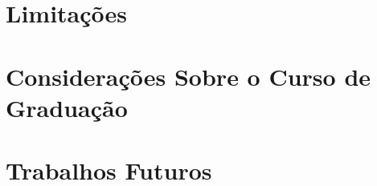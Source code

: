 %
%
%

\section{Limitações}
\label{sec:conc_limitacoes}


\section{Considerações Sobre o Curso de Graduação}
\label{sec:conc_graduacao}


\section{Trabalhos Futuros}
\label{sec:conc_futuros}

%
